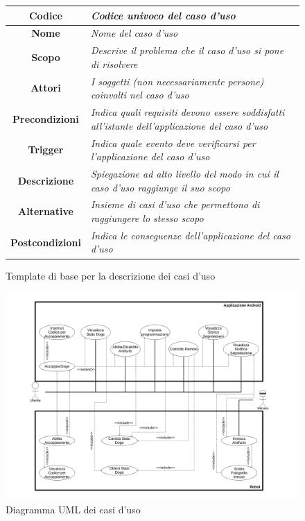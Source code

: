 \documentclass{article}
\begin{document}
\begin{figure}[htbp]
\centering
\begin{tabular}{|c|l|}
\hline
\textbf{Codice} & \textit{Codice univoco del caso d'uso} \\ \hline
\textbf{Nome} & \textit{Nome del caso d'uso} \\ \hline
\textbf{Scopo} & \textit{Descrive il problema che il caso d'uso si pone di risolvere} \\ \hline
\textbf{Attori} & \textit{I soggetti (non necessariamente persone) coinvolti nel caso d'uso} \\ \hline
\textbf{Precondizioni} & \textit{Indica quali requisiti devono essere soddisfatti all'istante dell'applicazione del caso d'uso} \\ \hline
\textbf{Trigger} & \textit{Indica quale evento deve verificarsi per l'applicazione del caso d'uso} \\ \hline
\textbf{Descrizione} & \textit{Spiegazione ad alto livello del modo in cui il caso d'uso raggiunge il suo scopo} \\ \hline
\textbf{Alternative} & \textit{Insieme di casi d'uso che permettono di raggiungere lo stesso scopo} \\ \hline
\textbf{Postcondizioni} & \textit{Indica le conseguenze dell'applicazione del caso d'uso} \\ \hline
\end{tabular}
\caption{Template di base per la descrizione dei casi d’uso}
\end{figure}

\begin{figure}[htbp]
\begin{adjustbox}{center}
\includegraphics[width=20cm]{UC-Diagram.pdf}
\end{adjustbox}
\caption{Diagramma UML dei casi d'uso}
\end{figure}
\end{document}
